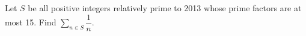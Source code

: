 Let $S$ be all positive integers relatively prime to 2013 whose prime factors are at most 15. Find $\sum_{n\in S}\dfrac{1}{n}$.
